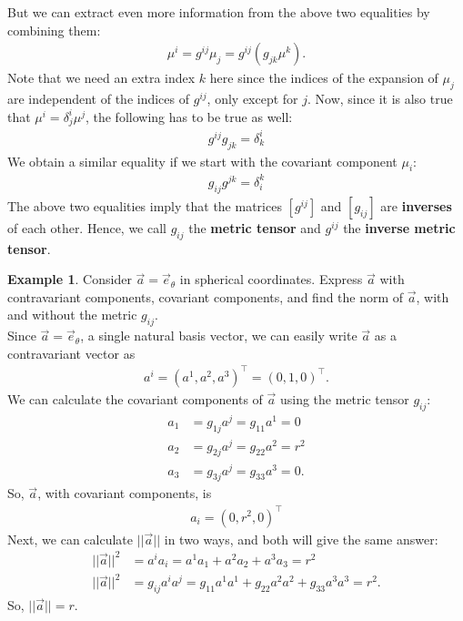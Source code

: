 \documentclass{article}
\theoremstyle{definition}
\newtheorem{exmp}{Example}[section]
\begin{document}
But we can extract even more information from the above two equalities by combining them:
\begin{align*}
\mu^i = g^{ij}\mu_j = g^{ij}\left(g_{jk}\mu^k\right). 
\end{align*}
Note that we need an extra index $k$ here since the indices of the expansion of $\mu_j$ are independent of the indices of $g^{ij}$, only except for $j$. Now, since it is also true that $\mu^i = \delta^i_j\mu^j$, the following has to be true as well:
\begin{align*}
\boxed{g^{ij}g_{jk} = \delta^i_k}
\end{align*}
We obtain a similar equality if we start with the covariant component $\mu_i$:
\begin{align*}
\boxed{g_{ij}g^{jk} = \delta^k_i}
\end{align*}
The above two equalities imply that the matrices $[g^{ij}]$ and $[g_{ij}]$ are \textbf{inverses} of each other. Hence, we call $g_{ij}$ the \textbf{metric tensor} and $g^{ij}$ the \textbf{inverse metric tensor}. 
\begin{exmp}
Consider $\vec{a} = \vec{e}_\theta$ in spherical coordinates. Express $\vec{a}$ with contravariant components, covariant components, and find the norm of $\vec{a}$, with and without the metric $g_{ij}$.\\

Since $\vec{a} = \vec{e}_\theta$, a single natural basis vector, we can easily write $\vec{a}$ as a contravariant vector as 
\begin{align*}
a^i = (a^1, a^2, a^3)^\top = (0,1,0)^\top. 
\end{align*}
We can calculate the covariant components of $\vec{a}$ using the metric tensor $g_{ij}$:
\begin{align*}
a_1 &= g_{1j}a^j = g_{11}a^1 = 0\\
a_2 &= g_{2j}a^j = g_{22}a^2 = r^2\\
a_3 &= g_{3j}a^j = g_{33}a^3 = 0.
\end{align*}
So, $\vec{a}$, with covariant components, is
\begin{align*}
a_i = (0, r^2, 0)^\top
\end{align*}
Next, we can calculate $\vert\vert \vec{a} \vert\vert$ in two ways, and both will give the same answer:
\begin{align*}
\vert\vert \vec{a} \vert\vert^2 &= a^ia_i = a^1a_1 + a^2a_2+a^3a_3 = r^2\\
\vert\vert \vec{a} \vert\vert^2 &= g_{ij}a^ia^j = g_{11}a^1a^1 +g_{22}a^2a^2 + g_{33}a^3a^3 = r^2.
\end{align*}
So, $\vert\vert \vec{a} \vert\vert  = r$.

\end{exmp}
\end{document}
